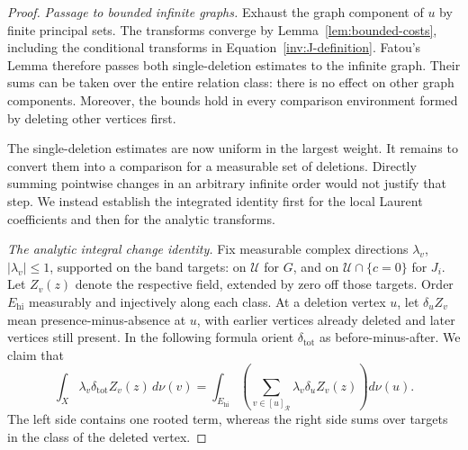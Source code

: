 \begin{proof}
\emph{Passage to bounded infinite graphs.}
Exhaust the graph component of $u$ by finite principal sets.  The
transforms converge by Lemma~\ref{lem:bounded-costs}, including the
conditional transforms in Equation~\eqref{inv:J-definition}.  Fatou's
Lemma therefore passes both single-deletion estimates to the infinite
graph.  Their sums can be taken over the entire relation class: there
is no effect on other graph components.  Moreover, the bounds hold in
every comparison environment formed by deleting other vertices first.

The single-deletion estimates are now uniform in the largest weight.
It remains to convert them into a comparison for a measurable set of
deletions.  Directly summing pointwise changes in an arbitrary infinite
order would not justify that step.  We instead establish the integrated
identity first for the local Laurent coefficients and then for the
analytic transforms.

\emph{The analytic integral change identity.}
Fix measurable complex directions $\lambda_v$, $|\lambda_v|\leq1$,
supported on the band targets: on $\mathcal U$ for $G$, and on
$\mathcal U\cap\{c=0\}$ for $J_i$.  Let $Z_v(z)$ denote the respective
field, extended by zero off those targets.  Order $E_{\mathrm{hi}}$
measurably and injectively along each class.  At a deletion vertex $u$,
let $\delta_u Z_v$ mean presence-minus-absence at $u$, with earlier
vertices already deleted and later vertices still present.  In the
following formula orient $\delta_{\mathrm{tot}}$ as
before-minus-after.  We claim that
\begin{equation}\label{inv:analytic-change}
 \int_X\lambda_v\delta_{\mathrm{tot}}Z_v(z)\,d\nu(v)
   =\int_{E_{\mathrm{hi}}}
       \left(\sum_{v\in[u]_{\mathcal R}}
                    \lambda_v\delta_u Z_v(z)\right)d\nu(u).
\end{equation}
The left side contains one rooted term, whereas the right side sums
over targets in the class of the deleted vertex.


\end{proof}
